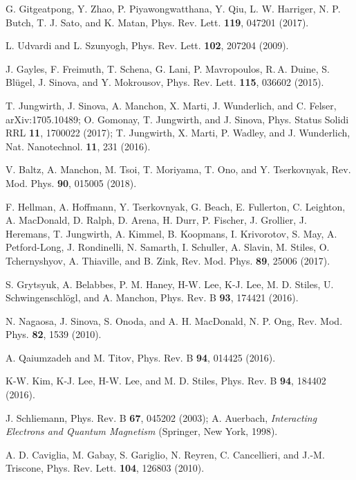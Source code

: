 \documentclass[aps,prl,twocolumn,amsmath,amssymb,superscriptaddress]{revtex4}%
\begin{document}
\begin{thebibliography}{9}
G. Gitgeatpong, Y. Zhao, P. Piyawongwatthana, Y. Qiu, L. W. Harriger, N. P. Butch, T. J. Sato, and K. Matan, Phys. Rev. Lett. \textbf{119}, 047201 (2017).

L. Udvardi and L. Szunyogh, Phys. Rev. Lett. \textbf{102}, 207204 (2009).

J. Gayles, F. Freimuth, T. Schena, G. Lani, P. Mavropoulos, R. A. Duine, S. Bl\"{u}gel, J. Sinova, and Y. Mokrousov, Phys. Rev. Lett. \textbf{115}, 036602 (2015).

T. Jungwirth, J. Sinova, A. Manchon, X. Marti, J. Wunderlich, and C. Felser, arXiv:1705.10489; O. Gomonay, T. Jungwirth, and J. Sinova, Phys. Status Solidi RRL \textbf{11}, 1700022 (2017); T. Jungwirth, X. Marti, P. Wadley, and J. Wunderlich, Nat. Nanotechnol. \textbf{11}, 231 (2016).	

V. Baltz, A. Manchon, M. Tsoi, T. Moriyama, T. Ono, and Y. Tserkovnyak, Rev. Mod. Phys. \textbf{90}, 015005 (2018).

F. Hellman, A. Hoffmann, Y. Tserkovnyak, G. Beach, E. Fullerton, C. Leighton, A. MacDonald, D. Ralph, D. Arena, H. Durr, P. Fischer, J. Grollier, J. Heremans, T. Jungwirth, A. Kimmel, B. Koopmans, I. Krivorotov, S. May, A. Petford-Long, J. Rondinelli, N. Samarth, I. Schuller, A. Slavin, M. Stiles, O. Tchernyshyov, A. Thiaville, and B. Zink, Rev. Mod. Phys. \textbf{89}, 25006 (2017).

S. Grytsyuk, A. Belabbes, P. M. Haney, H-W. Lee, K-J. Lee, M. D. Stiles, U. Schwingenschl\"{o}gl, and A. Manchon, Phys. Rev. B \textbf{93}, 174421 (2016).

N. Nagaosa, J. Sinova, S. Onoda, and A. H. MacDonald, N. P. Ong, Rev. Mod. Phys. \textbf{82}, 1539 (2010).

A. Qaiumzadeh and M. Titov, Phys. Rev. B \textbf{94}, 014425 (2016).

K-W. Kim, K-J. Lee, H-W. Lee, and M. D. Stiles, Phys. Rev. B \textbf{94}, 184402 (2016).

J. Schliemann, Phys. Rev. B \textbf{67}, 045202 (2003); A. Auerbach, \textit{Interacting Electrons and Quantum Magnetism} (Springer, New York, 1998).


A. D. Caviglia, M. Gabay, S. Gariglio, N. Reyren, C. Cancellieri, and J.-M. Triscone, Phys. Rev. Lett. \textbf{104}, 126803 (2010).



\end{thebibliography}
\end{document}

